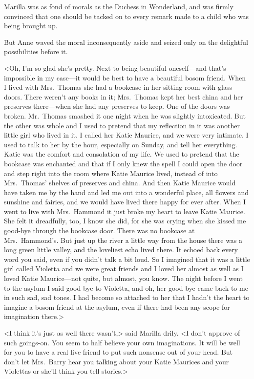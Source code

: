 Marilla was as fond of morals as the Duchess in Wonderland, and was firmly convinced that one should be tacked on to every remark made to a child who was being brought up.

But Anne waved the moral inconsequently aside and seized only on the delightful possibilities before it.

<Oh, I'm so glad she's pretty. Next to being beautiful oneself—and that's impossible in my case—it would be best to have a beautiful bosom friend. When I lived with Mrs.~Thomas she had a bookcase in her sitting room with glass doors. There weren't any books in it; Mrs.~Thomas kept her best china and her preserves there—when she had any preserves to keep. One of the doors was broken. Mr.~Thomas smashed it one night when he was slightly intoxicated. But the other was whole and I used to pretend that my reflection in it was another little girl who lived in it. I called her Katie Maurice, and we were very intimate. I used to talk to her by the hour, especially on Sunday, and tell her everything. Katie was the comfort and consolation of my life. We used to pretend that the bookcase was enchanted and that if I only knew the spell I could open the door and step right into the room where Katie Maurice lived, instead of into Mrs.~Thomas' shelves of preserves and china. And then Katie Maurice would have taken me by the hand and led me out into a wonderful place, all flowers and sunshine and fairies, and we would have lived there happy for ever after. When I went to live with Mrs.~Hammond it just broke my heart to leave Katie Maurice. She felt it dreadfully, too, I know she did, for she was crying when she kissed me good-bye through the bookcase door. There was no bookcase at Mrs.~Hammond's. But just up the river a little way from the house there was a long green little valley, and the loveliest echo lived there. It echoed back every word you said, even if you didn't talk a bit loud. So I imagined that it was a little girl called Violetta and we were great friends and I loved her almost as well as I loved Katie Maurice—not quite, but almost, you know. The night before I went to the asylum I said good-bye to Violetta, and oh, her good-bye came back to me in such sad, sad tones. I had become so attached to her that I hadn't the heart to imagine a bosom friend at the asylum, even if there had been any scope for imagination there.>

<I think it's just as well there wasn't,> said Marilla drily. <I don't approve of such goings-on. You seem to half believe your own imaginations. It will be well for you to have a real live friend to put such nonsense out of your head. But don't let Mrs.~Barry hear you talking about your Katie Maurices and your Violettas or she'll think you tell stories.>

